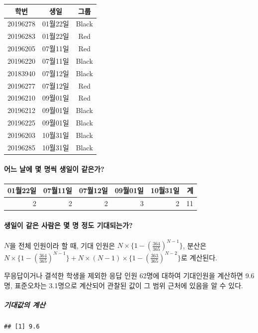 \documentclass[
]{article}
\begin{document}
\begin{longtable}[]{@{}ccc@{}}
\toprule
학번 & 생일 & 그룹\tabularnewline
\midrule
\endhead
20196278 & 01월22일 & Black\tabularnewline
20196283 & 01월22일 & Red\tabularnewline
20196205 & 07월11일 & Red\tabularnewline
20196220 & 07월11일 & Black\tabularnewline
20183940 & 07월12일 & Black\tabularnewline
20196277 & 07월12일 & Red\tabularnewline
20196210 & 09월01일 & Red\tabularnewline
20196212 & 09월01일 & Black\tabularnewline
20196225 & 09월01일 & Black\tabularnewline
20196203 & 10월31일 & Black\tabularnewline
20196285 & 10월31일 & Black\tabularnewline
\bottomrule
\end{longtable}

\hypertarget{uxc5b4uxb290-uxb0a0uxc5d0-uxba87-uxba85uxc529-uxc0dduxc77cuxc774-uxac19uxc740uxac00}{%
\paragraph{어느 날에 몇 명씩 생일이
같은가?}\label{uxc5b4uxb290-uxb0a0uxc5d0-uxba87-uxba85uxc529-uxc0dduxc77cuxc774-uxac19uxc740uxac00}}

\begin{longtable}[]{@{}rrrrrr@{}}
\toprule
01월22일 & 07월11일 & 07월12일 & 09월01일 & 10월31일 & 계\tabularnewline
\midrule
\endhead
2 & 2 & 2 & 3 & 2 & 11\tabularnewline
\bottomrule
\end{longtable}

\hypertarget{uxc0dduxc77cuxc774-uxac19uxc740-uxc0acuxb78cuxc740-uxba87-uxba85-uxc815uxb3c4-uxae30uxb300uxb418uxb294uxac00}{%
\paragraph{생일이 같은 사람은 몇 명 정도
기대되는가?}\label{uxc0dduxc77cuxc774-uxac19uxc740-uxc0acuxb78cuxc740-uxba87-uxba85-uxc815uxb3c4-uxae30uxb300uxb418uxb294uxac00}}

\(N\)을 전체 인원이라 할 때, 기대 인원은
\(N\times\{1- (\frac{364}{365})^{N-1}\}\), 분산은
\(N\times\{1- (\frac{364}{365})^{N-1}\} + N\times(N-1)\times\{1-(\frac{363}{365})^{N-2}\}\)로
계산된다.

무응답이거나 결석한 학생을 제외한 응답 인원 62명에 대하여 기대인원을
계산하면 9.6명, 표준오차는 3.1명으로 계산되어 관찰된 값이 그 범위 근처에
있음을 알 수 있다.

\hypertarget{uxae30uxb300uxac12uxc758-uxacc4uxc0b0}{%
\subparagraph{기대값의
계산}\label{uxae30uxb300uxac12uxc758-uxacc4uxc0b0}}

\begin{verbatim}
## [1] 9.6
\end{verbatim}
\end{document}
